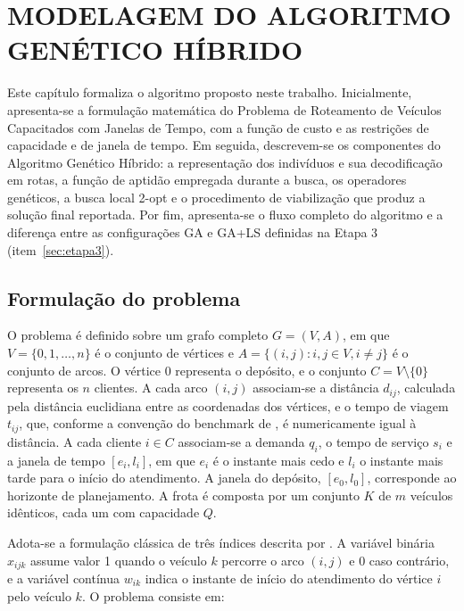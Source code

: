 \chapter{MODELAGEM DO ALGORITMO GENÉTICO HÍBRIDO}
\label{cap:modelagem}

Este capítulo formaliza o algoritmo proposto neste trabalho. Inicialmente, apresenta-se
a formulação matemática do Problema de Roteamento de Veículos Capacitados com Janelas de
Tempo, com a função de custo e as restrições de capacidade e de janela de tempo. Em
seguida, descrevem-se os componentes do Algoritmo Genético Híbrido: a representação dos
indivíduos e sua decodificação em rotas, a função de aptidão empregada durante a busca,
os operadores genéticos, a busca local 2-opt e o procedimento de viabilização que produz
a solução final reportada. Por fim, apresenta-se o fluxo completo do algoritmo e a
diferença entre as configurações GA e GA+LS definidas na Etapa 3
(item~\ref{sec:etapa3}).

\section{Formulação do problema}
\label{sec:formulacao}

O problema é definido sobre um grafo completo $G = (V, A)$, em que $V = \{0, 1, \dots,
n\}$ é o conjunto de vértices e $A = \{(i, j) : i, j \in V, i \neq j\}$ é o conjunto de
arcos. O vértice $0$ representa o depósito, e o conjunto $C = V \setminus \{0\}$
representa os $n$ clientes. A cada arco $(i, j)$ associam-se a distância $d_{ij}$,
calculada pela distância euclidiana entre as coordenadas dos vértices, e o tempo de
viagem $t_{ij}$, que, conforme a convenção do benchmark de , é
numericamente igual à distância. A cada cliente $i \in C$ associam-se a demanda $q_i$, o
tempo de serviço $s_i$ e a janela de tempo $[e_i, l_i]$, em que $e_i$ é o instante mais
cedo e $l_i$ o instante mais tarde para o início do atendimento. A janela do depósito,
$[e_0, l_0]$, corresponde ao horizonte de planejamento. A frota é composta por um
conjunto $K$ de $m$ veículos idênticos, cada um com capacidade $Q$.

Adota-se a formulação clássica de três índices descrita por . A
variável binária $x_{ijk}$ assume valor 1 quando o veículo $k$ percorre o arco $(i, j)$
e 0 caso contrário, e a variável contínua $w_{ik}$ indica o instante de início do
atendimento do vértice $i$ pelo veículo $k$. O problema consiste em:

